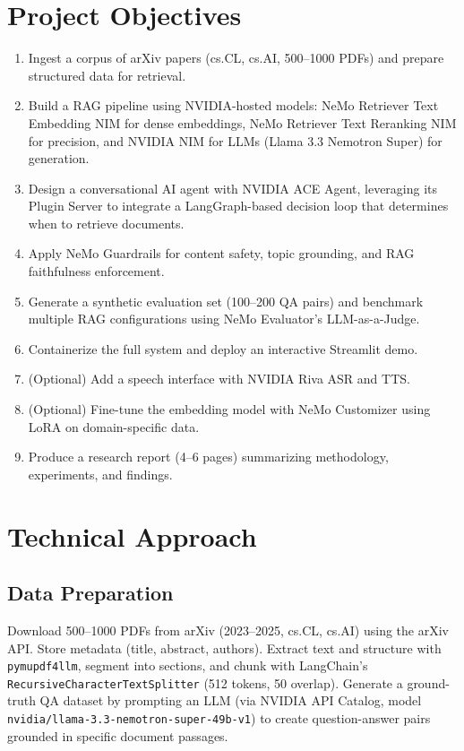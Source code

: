 \documentclass[a4paper,11pt]{article}
\begin{document}
\section{Project Objectives}
\begin{enumerate}[noitemsep]
    \item Ingest a corpus of arXiv papers (cs.CL, cs.AI, 500--1000 PDFs) and prepare structured data for retrieval.
    \item Build a RAG pipeline using NVIDIA-hosted models: NeMo Retriever Text Embedding NIM for dense embeddings, NeMo Retriever Text Reranking NIM for precision, and NVIDIA NIM for LLMs (Llama 3.3 Nemotron Super) for generation.
    \item Design a conversational AI agent with NVIDIA ACE Agent, leveraging its Plugin Server to integrate a LangGraph-based decision loop that determines when to retrieve documents.
    \item Apply NeMo Guardrails for content safety, topic grounding, and RAG faithfulness enforcement.
    \item Generate a synthetic evaluation set (100--200 QA pairs) and benchmark multiple RAG configurations using NeMo Evaluator's LLM-as-a-Judge.
    \item Containerize the full system and deploy an interactive Streamlit demo.
    \item (Optional) Add a speech interface with NVIDIA Riva ASR and TTS.
    \item (Optional) Fine-tune the embedding model with NeMo Customizer using LoRA on domain-specific data.
    \item Produce a research report (4--6 pages) summarizing methodology, experiments, and findings.
\end{enumerate}

\section{Technical Approach}

\subsection{Data Preparation}
Download 500--1000 PDFs from arXiv (2023--2025, cs.CL, cs.AI) using the arXiv API. Store metadata (title, abstract, authors). Extract text and structure with \texttt{pymupdf4llm}, segment into sections, and chunk with LangChain's \texttt{RecursiveCharacterTextSplitter} (512 tokens, 50 overlap). Generate a ground-truth QA dataset by prompting an LLM (via NVIDIA API Catalog, model \texttt{nvidia/llama-3.3-nemotron-super-49b-v1}) to create question-answer pairs grounded in specific document passages.
\end{document}
